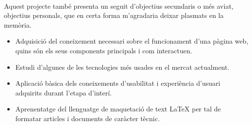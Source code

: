     \paragraph{}
    Aquest projecte també presenta un seguit d’objectius secundaris o més aviat, objectius personals, que en certa forma m’agradaria deixar plasmats en la memòria.

    \begin{itemize}
        \item Adquisició del coneixement necessari sobre el funcionament d'una pàgina web, quins són els seus components principals i com interactuen.
        \item Estudi d'algunes de les tecnologies més usades en el mercat actualment.
        \item Aplicació bàsica dels coneixements d’usabilitat i experiència d’usuari adquirits durant l’etapa d’interí.
        \item Aprenentatge del llenguatge de maquetació de text LaTeX per tal de formatar articles i documents de caràcter tècnic.
    \end{itemize}

